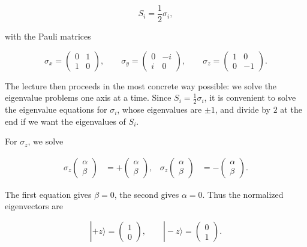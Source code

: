 \begin{equation}
S_i=\frac12 \sigma_i,
\end{equation}

with the Pauli matrices

\begin{equation}
\sigma_x=
\begin{pmatrix}
0&1\\
1&0
\end{pmatrix},
\qquad
\sigma_y=
\begin{pmatrix}
0&-i\\
i&0
\end{pmatrix},
\qquad
\sigma_z=
\begin{pmatrix}
1&0\\
0&-1
\end{pmatrix}.
\end{equation}

The lecture then proceeds in the most concrete way possible: we solve the eigenvalue problems one axis at a time. Since \(S_i=\tfrac12 \sigma_i\), it is convenient to solve the eigenvalue equations for \(\sigma_i\), whose eigenvalues are \(\pm1\), and divide by \(2\) at the end if we want the eigenvalues of \(S_i\).

For \(\sigma_z\), we solve

\begin{align}
\sigma_z
\begin{pmatrix}
\alpha\\
\beta
\end{pmatrix}
&=
+
\begin{pmatrix}
\alpha\\
\beta
\end{pmatrix},
&
\sigma_z
\begin{pmatrix}
\alpha\\
\beta
\end{pmatrix}
&=
-
\begin{pmatrix}
\alpha\\
\beta
\end{pmatrix}.
\end{align}

The first equation gives \(\beta=0\), the second gives \(\alpha=0\). Thus the normalized eigenvectors are

\begin{equation}
|+\!z\rangle=
\begin{pmatrix}
1\\
0
\end{pmatrix},
\qquad
|-\!z\rangle=
\begin{pmatrix}
0\\
1
\end{pmatrix}.
\end{equation}

